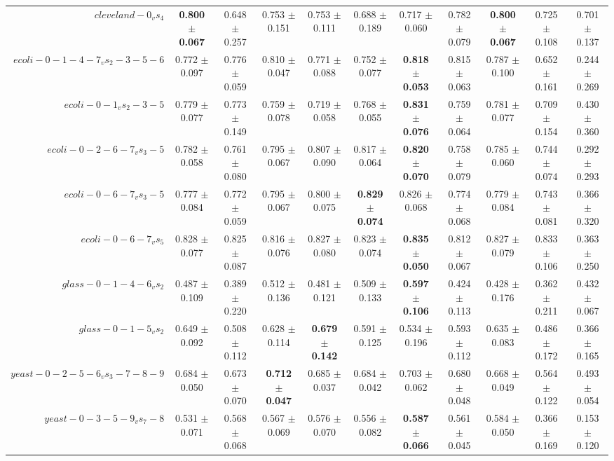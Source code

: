 \begin{table}[!ht]
{\begin{tabular}{r c c c c c c c c c c}
$cleveland-0_vs_4$ & \textbf{0.800 $\pm$ 0.067} & 0.648 $\pm$ 0.257 & 0.753 $\pm$ 0.151 & 0.753 $\pm$ 0.111 & 0.688 $\pm$ 0.189 & 0.717 $\pm$ 0.060 & 0.782 $\pm$ 0.079 & \textbf{0.800 $\pm$ 0.067} & 0.725 $\pm$ 0.108 & 0.701 $\pm$ 0.137 \\
$ecoli-0-1-4-7_vs_2-3-5-6$ & 0.772 $\pm$ 0.097 & 0.776 $\pm$ 0.059 & 0.810 $\pm$ 0.047 & 0.771 $\pm$ 0.088 & 0.752 $\pm$ 0.077 & \textbf{0.818 $\pm$ 0.053} & 0.815 $\pm$ 0.063 & 0.787 $\pm$ 0.100 & 0.652 $\pm$ 0.161 & 0.244 $\pm$ 0.269 \\
$ecoli-0-1_vs_2-3-5$ & 0.779 $\pm$ 0.077 & 0.773 $\pm$ 0.149 & 0.759 $\pm$ 0.078 & 0.719 $\pm$ 0.058 & 0.768 $\pm$ 0.055 & \textbf{0.831 $\pm$ 0.076} & 0.759 $\pm$ 0.064 & 0.781 $\pm$ 0.077 & 0.709 $\pm$ 0.154 & 0.430 $\pm$ 0.360 \\
$ecoli-0-2-6-7_vs_3-5$ & 0.782 $\pm$ 0.058 & 0.761 $\pm$ 0.080 & 0.795 $\pm$ 0.067 & 0.807 $\pm$ 0.090 & 0.817 $\pm$ 0.064 & \textbf{0.820 $\pm$ 0.070} & 0.758 $\pm$ 0.079 & 0.785 $\pm$ 0.060 & 0.744 $\pm$ 0.074 & 0.292 $\pm$ 0.293 \\
$ecoli-0-6-7_vs_3-5$ & 0.777 $\pm$ 0.084 & 0.772 $\pm$ 0.059 & 0.795 $\pm$ 0.067 & 0.800 $\pm$ 0.075 & \textbf{0.829 $\pm$ 0.074} & 0.826 $\pm$ 0.068 & 0.774 $\pm$ 0.068 & 0.779 $\pm$ 0.084 & 0.743 $\pm$ 0.081 & 0.366 $\pm$ 0.320 \\
$ecoli-0-6-7_vs_5$ & 0.828 $\pm$ 0.077 & 0.825 $\pm$ 0.087 & 0.816 $\pm$ 0.076 & 0.827 $\pm$ 0.080 & 0.823 $\pm$ 0.074 & \textbf{0.835 $\pm$ 0.050} & 0.812 $\pm$ 0.067 & 0.827 $\pm$ 0.079 & 0.833 $\pm$ 0.106 & 0.363 $\pm$ 0.250 \\
$glass-0-1-4-6_vs_2$ & 0.487 $\pm$ 0.109 & 0.389 $\pm$ 0.220 & 0.512 $\pm$ 0.136 & 0.481 $\pm$ 0.121 & 0.509 $\pm$ 0.133 & \textbf{0.597 $\pm$ 0.106} & 0.424 $\pm$ 0.113 & 0.428 $\pm$ 0.176 & 0.362 $\pm$ 0.211 & 0.432 $\pm$ 0.067 \\
$glass-0-1-5_vs_2$ & 0.649 $\pm$ 0.092 & 0.508 $\pm$ 0.112 & 0.628 $\pm$ 0.114 & \textbf{0.679 $\pm$ 0.142} & 0.591 $\pm$ 0.125 & 0.534 $\pm$ 0.196 & 0.593 $\pm$ 0.112 & 0.635 $\pm$ 0.083 & 0.486 $\pm$ 0.172 & 0.366 $\pm$ 0.165 \\
$yeast-0-2-5-6_vs_3-7-8-9$ & 0.684 $\pm$ 0.050 & 0.673 $\pm$ 0.070 & \textbf{0.712 $\pm$ 0.047} & 0.685 $\pm$ 0.037 & 0.684 $\pm$ 0.042 & 0.703 $\pm$ 0.062 & 0.680 $\pm$ 0.048 & 0.668 $\pm$ 0.049 & 0.564 $\pm$ 0.122 & 0.493 $\pm$ 0.054 \\
$yeast-0-3-5-9_vs_7-8$ & 0.531 $\pm$ 0.071 & 0.568 $\pm$ 0.068 & 0.567 $\pm$ 0.069 & 0.576 $\pm$ 0.070 & 0.556 $\pm$ 0.082 & \textbf{0.587 $\pm$ 0.066} & 0.561 $\pm$ 0.045 & 0.584 $\pm$ 0.050 & 0.366 $\pm$ 0.169 & 0.153 $\pm$ 0.120 \\

\end{tabular}}
\end{table}
